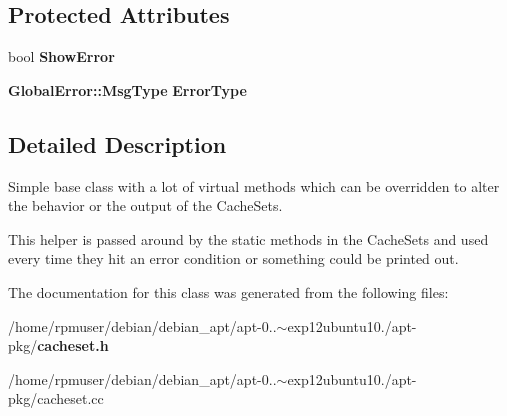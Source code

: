 \subsection*{\-Protected \-Attributes}
\begin{DoxyCompactItemize}
\item 
bool {\bfseries \-Show\-Error}\label{classAPT_1_1CacheSetHelper_ac8a78ec3420af78bc9c267037796ae30}

\item 
{\bf \-Global\-Error\-::\-Msg\-Type} {\bfseries \-Error\-Type}\label{classAPT_1_1CacheSetHelper_a87f795887eac5fd7f1db494585de5681}

\end{DoxyCompactItemize}


\subsection{\-Detailed \-Description}
\-Simple base class with a lot of virtual methods which can be overridden to alter the behavior or the output of the \-Cache\-Sets.

\-This helper is passed around by the static methods in the \-Cache\-Sets and used every time they hit an error condition or something could be printed out. 

\-The documentation for this class was generated from the following files\-:\begin{DoxyCompactItemize}
\item 
/home/rpmuser/debian/debian\-\_\-apt/apt-\/0..$\sim$exp12ubuntu10./apt-\/pkg/{\bf cacheset.\-h}\item 
/home/rpmuser/debian/debian\-\_\-apt/apt-\/0..$\sim$exp12ubuntu10./apt-\/pkg/cacheset.\-cc\end{DoxyCompactItemize}
